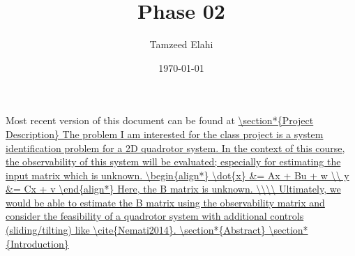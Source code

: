 \documentclass[12pt]{article}
\title{Phase 02}
\author{Tamzeed Elahi}
\date{\today}
\begin{document}
\maketitle

Most recent version of this document can be found at \url{

\section*{Project Description}
The problem I am interested for the class project is a system identification problem for a 2D quadrotor system. In the context of this course, the observability of this system will be evaluated; especially for estimating the input matrix which is unknown. 
\begin{align*}
    \dot{x} &= Ax + Bu + w \\
    y &= Cx + v
\end{align*} 
Here, the B matrix is unknown. \\\\
Ultimately, we would be able to estimate the B matrix using the observability matrix and consider the feasibility of a quadrotor system with additional controls (sliding/tilting) like \cite{Nemati2014}. 

\section*{Abstract}



\section*{Introduction}



}
\end{document}
